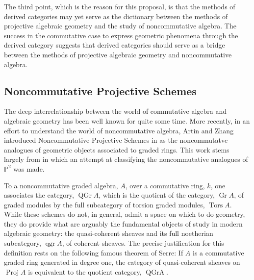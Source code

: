 \documentclass[11pt]{article}
\begin{document}
The third point, which is the reason for this proposal, is that the methods of derived categories may yet serve as the dictionary between the methods of projective algebraic geometry and the study of noncommutative algebra.
The success in the commutative case to express geometric phenomena through the derived category suggests that derived categories should serve as a bridge between the methods of projective algebraic geometry and noncommutative algebra.

\subsection{Noncommutative Projective Schemes}
The deep interrelationship between the world of commutative algebra and algebraic geometry has been well known for quite some time.
More recently, in an effort to understand the world of noncommutative algebra, Artin and Zhang introduced Noncommutative Projective Schemes in \cite{AZ94} as the noncommutatve analogues of geometric objects associated to graded rings.
This work stems largely from \cite{AS87} in which an attempt at classifying the noncommutative analogues of $\mathbb{P}^2$ was made.

To a noncommutative graded algebra, $A$, over a commutative ring, $k$, one associates the category, $\operatorname{QGr} A$, which is the quotient of the category, $\operatorname{Gr} A$, of graded modules by the full subcategory of torsion graded modules, $\operatorname{Tors} A$.
While these schemes do not, in general, admit a space on which to do geometry, they do provide what are arguably the fundamental objects of study in modern algebraic geometry: the quasi-coherent sheaves and its full noetherian subcategory, $\operatorname{qgr} A$, of coherent sheaves.
The  precise justification for this definition rests on the following famous theorem of Serre: If $A$ is a commutative graded ring generated in degree one, the category of quasi-coherent sheaves on $\operatorname{Proj} A$ is equivalent to the quotient category, $\operatorname{QGr A}$.
\end{document}
